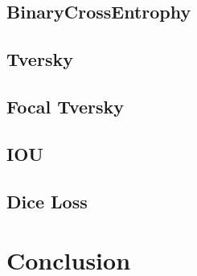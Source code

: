 \subsection{BinaryCrossEntrophy}

\subsection{Tversky}

\subsection{Focal Tversky}

\subsection{IOU}

\subsection{Dice Loss}




\section{Conclusion}
\vspace{0.2in}
\hspace*{0.16in}

\newpage
